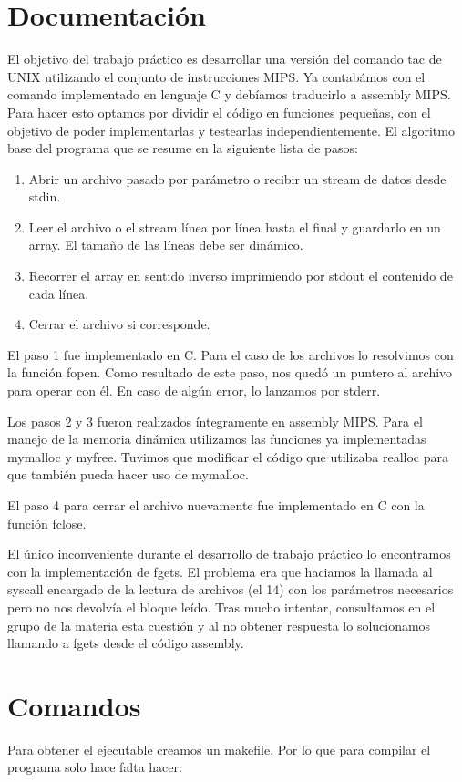 \documentclass[a4paper,11pt]{article}
\begin{document}
\section{Documentaci\'on}
El objetivo del trabajo pr\'actico es desarrollar una versi\'on del comando tac de UNIX utilizando el conjunto de instrucciones MIPS. 
Ya contab\'amos con el comando implementado en lenguaje C y deb\'iamos traducirlo a assembly MIPS. Para hacer esto optamos por dividir el c\'odigo en funciones peque\~nas, con el objetivo de poder implementarlas y testearlas independientemente.
El algoritmo base del programa que se resume en la siguiente lista de pasos:
\begin{enumerate}
	\item Abrir un archivo pasado por par\'ametro o recibir un stream de datos desde stdin.
	\item Leer el archivo o el stream l\'inea por l\'inea hasta el final y guardarlo en un array. El tama\~no de las l\'ineas debe ser din\'amico.
	\item Recorrer el array en sentido inverso imprimiendo por stdout el contenido de cada l\'inea.
	\item Cerrar el archivo si corresponde.
\end{enumerate}

El paso 1 fue implementado en C. Para el caso de los archivos lo resolvimos con la funci\'on fopen. Como resultado de este paso, nos qued\'o un puntero al archivo para operar con \'el. En caso de alg\'un error, lo lanzamos por stderr.

Los pasos 2 y 3 fueron realizados \'integramente en assembly MIPS. Para el manejo de la memoria din\'amica utilizamos las funciones ya implementadas mymalloc y myfree. Tuvimos que modificar el c\'odigo que utilizaba realloc para que tambi\'en pueda hacer uso de mymalloc.


El paso 4 para cerrar el archivo nuevamente fue implementado en C con la funci\'on fclose. 


El \'unico inconveniente durante el desarrollo de trabajo pr\'actico lo encontramos con la implementaci\'on de fgets. El problema era que haciamos la llamada al syscall encargado de la lectura de archivos (el 14) con los par\'ametros necesarios pero no nos devolv\'ia el bloque le\'ido. Tras mucho intentar, consultamos en el grupo de la materia esta cuesti\'on y al no obtener respuesta lo solucionamos llamando a fgets desde el c\'odigo assembly.

\section{Comandos}
Para obtener el ejecutable creamos un makefile. Por lo que para compilar el programa solo hace falta hacer:
\end{document}
